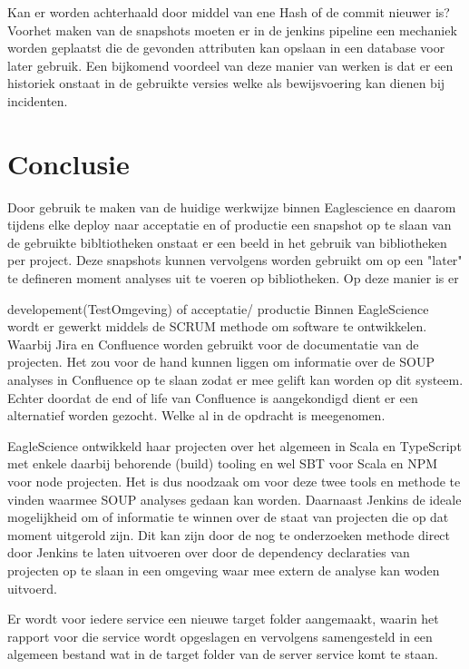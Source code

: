 Kan er worden achterhaald door middel van ene Hash of de commit nieuwer is?
Voorhet maken van de snapshots moeten er in de jenkins pipeline een mechaniek worden geplaatst die de gevonden attributen kan opslaan in een database voor later gebruik.
Een bijkomend voordeel van deze manier van werken is dat er een historiek onstaat in de gebruikte versies welke als bewijsvoering kan dienen bij incidenten.





\section{Conclusie}\label{sec:ESconclusie}
Door gebruik te maken van de huidige werkwijze binnen Eaglescience en daarom tijdens elke deploy naar acceptatie en of productie een snapshot op te slaan van de gebruikte bibltiotheken onstaat er een beeld in het gebruik van bibliotheken per project. Deze snapshots kunnen vervolgens worden gebruikt om op een "later" te defineren moment analyses uit te voeren op bibliotheken. Op deze manier is er

developement(TestOmgeving) of acceptatie/ productie
Binnen EagleScience wordt er gewerkt middels de SCRUM methode om software te ontwikkelen. Waarbij Jira en Confluence worden gebruikt voor de documentatie van de projecten. Het zou voor de hand kunnen liggen om informatie over de SOUP analyses in Confluence op te slaan zodat er mee gelift kan worden op dit systeem. Echter doordat de end of life van Confluence is aangekondigd dient er een alternatief worden gezocht. Welke al in de opdracht is meegenomen.

EagleScience ontwikkeld haar projecten over het algemeen in Scala en TypeScript met enkele daarbij behorende (build) tooling en wel SBT voor Scala en NPM voor node projecten. Het is dus noodzaak om voor deze twee tools en methode te vinden waarmee SOUP analyses gedaan kan worden. Daarnaast Jenkins de ideale mogelijkheid om of informatie te winnen over de staat van projecten die op dat moment uitgerold zijn. Dit kan zijn door de nog te onderzoeken methode direct door Jenkins te laten uitvoeren over door de dependency declaraties van projecten op te slaan in een omgeving waar mee extern de analyse kan woden uitvoerd.


Er wordt voor iedere service een nieuwe target folder aangemaakt, waarin het rapport voor die service wordt opgeslagen en vervolgens samengesteld in een algemeen bestand wat in de target folder van de server service komt te staan.


